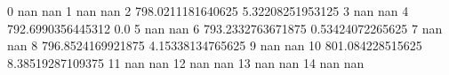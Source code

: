 0 nan nan
1 nan nan
2 798.0211181640625 5.32208251953125
3 nan nan
4 792.6990356445312 0.0
5 nan nan
6 793.2332763671875 0.53424072265625
7 nan nan
8 796.8524169921875 4.15338134765625
9 nan nan
10 801.084228515625 8.38519287109375
11 nan nan
12 nan nan
13 nan nan
14 nan nan
